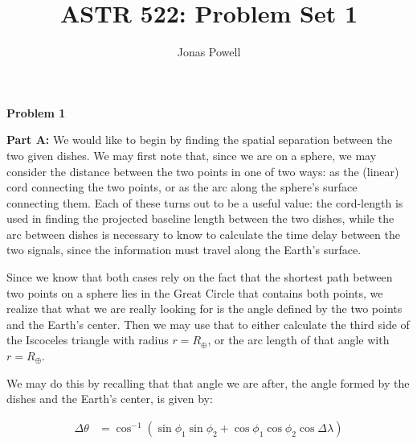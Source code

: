 \documentclass[12pt]{article}
\begin{document}
\title{\textbf{ASTR 522: Problem Set 1}}
\author{Jonas Powell}
\maketitle


\begin{onehalfspacing}

\raggedright{\textbf{\Large Problem 1}}\\
\raggedright{\textbf{\large Part A: }}
We would like to begin by finding the spatial separation between the two given dishes. We may first note that, since we are on a sphere, we may consider the distance between the two points in one of two ways: as the (linear) cord connecting the two points, or as the arc along the sphere's surface connecting them. Each of these turns out to be a useful value: the cord-length is used in finding the projected baseline length between the two dishes, while the arc between dishes is necessary to know to calculate the time delay between the two signals, since the information must travel along the Earth's surface. \bigskip

Since we know that both cases rely on the fact that the shortest path between two points on a sphere lies in the Great Circle that contains both points, we realize that what we are really looking for is the angle defined by the two points and the Earth's center. Then we may use that to either calculate the third side of the Iscoceles triangle with radius $r = R_{\oplus}$, or the arc length of that angle with $r = R_{\oplus}$. \bigskip

We may do this by recalling that that angle we are after, the angle formed by the dishes and the Earth's center, is given by:

\begin{align*}
  \Delta \theta &= \cos^{-1} \left( \sin{\phi_1} \sin{\phi_2} + \cos{\phi_1} \cos{\phi_2} \cos{\Delta \lambda} \right)
\end{align*}


\end{onehalfspacing}
\end{document}
